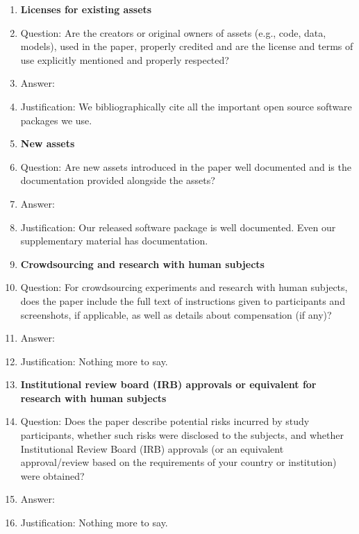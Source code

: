 \begin{enumerate}
	\item {\bf Licenses for existing assets}
	\item[] Question: Are the creators or original owners of assets (e.g., code, data, models), used in the paper, properly credited and are the license and terms of use explicitly mentioned and properly respected?
	\item[] Answer: \answerYes{} %
	\item[] Justification: We bibliographically cite all the important open
	      source software packages we use.

	\item {\bf New assets}
	\item[] Question: Are new assets introduced in the paper well documented and is the documentation provided alongside the assets?
	\item[] Answer: \answerYes{} %
	\item[] Justification: Our released software package is well documented. Even our supplementary material has documentation.

	\item {\bf Crowdsourcing and research with human subjects}
	\item[] Question: For crowdsourcing experiments and research with human subjects, does the paper include the full text of instructions given to participants and screenshots, if applicable, as well as details about compensation (if any)?
	\item[] Answer: \answerNA{} %
	\item[] Justification: Nothing more to say.

	\item {\bf Institutional review board (IRB) approvals or equivalent for research with human subjects}
	\item[] Question: Does the paper describe potential risks incurred by study participants, whether such risks were disclosed to the subjects, and whether Institutional Review Board (IRB) approvals (or an equivalent approval/review based on the requirements of your country or institution) were obtained?
	\item[] Answer: \answerNA{} %
	\item[] Justification: Nothing more to say.


\end{enumerate}
